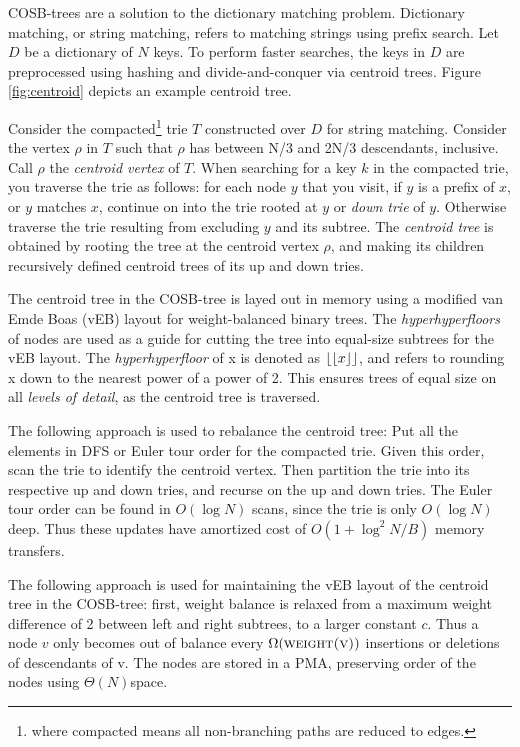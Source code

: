 \documentclass{style}
\begin{document}
COSB-trees are a solution to the dictionary matching problem. Dictionary matching, or string matching, refers to matching strings using prefix search. Let $D$ be a dictionary of $N$ keys. To perform faster searches, the keys in $D$ are preprocessed using hashing and divide-and-conquer via centroid trees. Figure \ref{fig:centroid} depicts an example centroid tree.

Consider the compacted\footnote{where compacted means all non-branching paths are reduced to edges.} trie $T$ constructed over $D$ for string matching.
Consider the vertex $\rho$ in $T$ such that $\rho$ has
between N/3 and 2N/3 descendants, inclusive. Call $\rho$ the \emph{centroid vertex} of $T$. When searching for a key $k$ in
the compacted trie, you traverse the trie as follows: for each node $y$ that
you visit, if $y$ is a prefix of $x$, or $y$ matches $x$, continue on into the
trie rooted at $y$ or \emph{down trie} of $y$. Otherwise traverse the trie
resulting from excluding $y$ and its subtree. The \emph{centroid tree} is
obtained by rooting the tree at the centroid vertex $\rho$, and making its
children recursively defined centroid trees of its up and down tries. 

The centroid tree in the COSB-tree is layed out in memory using a modified van Emde Boas (vEB) layout for
weight-balanced binary trees. The \emph{hyperhyperfloors} of nodes are used as
a guide for cutting the tree into equal-size subtrees for the vEB layout. The
\emph{hyperhyperfloor} of x is denoted as $\lfloor\lfloor{}x\rfloor\rfloor{}$, and
refers to rounding x down to the nearest power of a power of 2. This ensures
trees of equal size on all \emph{levels of detail}, as the centroid tree is
traversed.

The following approach is used to rebalance the centroid tree: Put all the
elements in DFS or Euler tour order for the compacted trie. Given this order, scan the trie to identify the centroid vertex. Then partition the trie into its respective
up and down tries, and recurse on the up and down tries. The Euler tour order
can be found in $O(\log{}N)$ scans, since the trie is only $O(\log{}N)$
deep. Thus these updates have amortized cost of $O(1+\log^{2}N/B)$ memory transfers.

The following approach is used for maintaining the vEB layout of the centroid
tree in the COSB-tree: first, weight balance is relaxed from a
maximum weight difference of 2 between left and right subtrees, to a larger
constant $c$. Thus a node $v$ only becomes out of balance every
$\Omega(\textsc{weight(v)})$ insertions or deletions of descendants of v. The nodes are stored in a PMA, preserving order of the nodes using $\Theta(N)$space.
\end{document}
